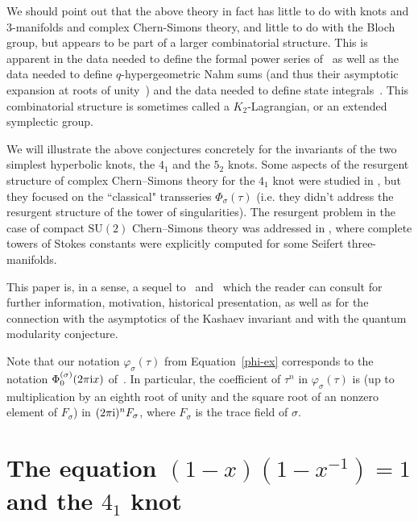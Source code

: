 \documentclass[12pt,reqno]{amsart}
\theoremstyle{definition}
\def\s{\sigma}
\def\ri{\mathrm{i}}
\def\ri{{\rm i}}
\def\SU{\mathrm{SU}}
\begin{document}

We should point out that the above theory in fact has little to do
with knots and 3-manifolds and complex Chern-Simons theory, and little
to do with the Bloch group, but appears to be part of a larger
combinatorial structure. This is apparent in the data needed to define
the formal power series of~\cite{DG,DG2} as well as the data needed to
define $q$-hypergeometric Nahm sums (and thus their asymptotic
expansion at roots of unity~\cite{GZ:asymptotics}) and the data needed
to define state integrals~\cite{GK:qseries}. This combinatorial
structure is sometimes called a $K_2$-Lagrangian, or an extended
symplectic group.

We will illustrate the above conjectures concretely for the invariants
of the two simplest hyperbolic knots, the $4_1$ and the $5_2$
knots. Some aspects of the resurgent structure of complex
Chern--Simons theory for the $4_1$ knot were studied in
\cite{gmp,gh-res}, but they focused on the ``classical" transseries
$\Phi_{\s}(\tau)$ (i.e. they didn't address the resurgent structure of
the tower of singularities). The resurgent problem in the case of
compact $\SU(2)$ Chern--Simons theory was addressed in \cite{CG, gmp},
where complete towers of Stokes constants were explicitly computed for
some Seifert three-manifolds.

This paper is, in a sense, a sequel to~\cite{GZ:kashaev}
and~\cite{GZ:qseries} which the reader can consult for further
information, motivation, historical presentation, as well as for the
connection with the asymptotics of the Kashaev invariant and with the
quantum modularity conjecture.

Note that our notation $\varphi_\s(\tau)$ from Equation~\eqref{phi-ex}
corresponds to the notation $\Phi^{(\s)}_0(2\pi \ri x)$
of~\cite{GZ:kashaev}.  In particular, the coefficient of $\tau^n$ in
$\varphi_\s(\tau)$ is (up to multiplication by an eighth root of unity
and the square root of an nonzero element of $F_\s$) in
$(2\pi \ri)^n F_\s$, where $F_\s$ is the trace field of $\s$.


\section{The equation $(1-x)(1-x^{-1})=1$ and the $4_1$ knot}
\label{sec.41}
\end{document}
